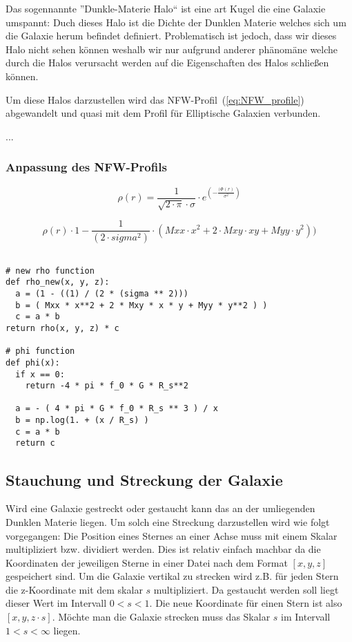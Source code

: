 Das sogennannte ''Dunkle-Materie Halo`` ist eine art Kugel die eine Galaxie
umspannt: Duch dieses Halo ist die Dichte der Dunklen Materie welches sich um die
Galaxie herum befindet definiert. Problematisch ist jedoch, dass wir dieses
Halo nicht sehen können weshalb wir nur aufgrund anderer phänomäne welche durch
die Halos verursacht werden auf die Eigenschaften des Halos schließen können.
\par
Um diese Halos darzustellen wird das NFW-Profil~(\ref{eq:NFW_profile})
abgewandelt und quasi mit dem Profil für Elliptische Galaxien verbunden.

...

\subsubsection{Anpassung des NFW-Profils}

\begin{equation}
  \rho(r) = \frac{1}{\sqrt{2 \cdot \pi} \cdot \sigma} \cdot
  e^{\left( - \frac{(\Phi(r)}{\sigma^{2}} \right)}
\end{equation}

\begin{equation}
  \rho(r) \cdot 1-\frac{1}{(2 \cdot sigma^{2} )} \cdot
  ( Mxx \cdot x^{2} + 2 \cdot Mxy \cdot xy + Myy \cdot y^{2} ))
\end{equation}

\begin{lstlisting}

# new rho function
def rho_new(x, y, z):
  a = (1 - ((1) / (2 * (sigma ** 2)))
  b = ( Mxx * x**2 + 2 * Mxy * x * y + Myy * y**2 ) )
  c = a * b
return rho(x, y, z) * c

# phi function
def phi(x):
  if x == 0:
    return -4 * pi * f_0 * G * R_s**2

  a = - ( 4 * pi * G * f_0 * R_s ** 3 ) / x
  b = np.log(1. + (x / R_s) )
  c = a * b
  return c

\end{lstlisting}


\subsection{Stauchung und Streckung der Galaxie}

Wird eine Galaxie gestreckt oder gestaucht kann das an der umliegenden Dunklen
Materie liegen. Um solch eine Streckung darzustellen wird wie folgt vorgegangen:
Die Position eines Sternes an einer Achse muss mit einem Skalar multipliziert
bzw. dividiert werden.
Dies ist relativ einfach machbar da die Koordinaten der jeweiligen Sterne
in einer Datei nach dem Format \( [x, y, z] \) gespeichert sind.
Um die Galaxie vertikal zu strecken wird z.B. für jeden Stern die z-Koordinate
mit dem skalar \( s \) multipliziert. Da gestaucht werden soll liegt dieser
Wert im Intervall \( 0 < s < 1 \). Die neue Koordinate für einen Stern ist also
\( [x, y, z \cdot s] \). Möchte man die Galaxie strecken muss das Skalar \( s \)
im Intervall \( 1 < s < \infty \) liegen.

